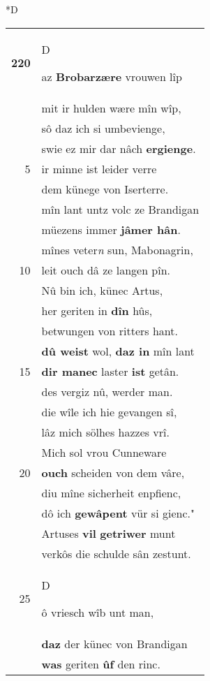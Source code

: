 \documentclass[8pt,a4paper,notitlepage]{article}
\begin{document}
\begin{table}[ht]
\begin{minipage}[t]{0.5\linewidth}
\small
\begin{center}*D
\end{center}
\begin{tabular}{rl}
\textbf{220} & \begin{large}D\end{large}az \textbf{Brobarzære} vrouwen lîp\\ 
 & mit ir hulden wære mîn wîp,\\ 
 & sô daz ich si umbevienge,\\ 
 & swie ez mir dar nâch \textbf{ergienge}.\\ 
5 & ir minne ist leider verre\\ 
 & dem künege von Iserterre.\\ 
 & mîn lant untz volc ze Brandigan\\ 
 & müezens immer \textbf{jâmer hân}.\\ 
 & mînes veter\textit{n} sun, Mabonagrin,\\ 
10 & leit ouch dâ ze langen pîn.\\ 
 & Nû bin ich, künec Artus,\\ 
 & her geriten in \textbf{dîn} hûs,\\ 
 & betwungen von ritters hant.\\ 
 & \textbf{dû weist} wol, \textbf{daz in} mîn lant\\ 
15 & \textbf{dir manec} laster \textbf{ist} getân.\\ 
 & des vergiz nû, werder man.\\ 
 & die wîle ich hie gevangen sî,\\ 
 & lâz mich sölhes hazzes vrî.\\ 
 & Mich sol vrou Cunneware\\ 
20 & \textbf{ouch} scheiden von dem vâre,\\ 
 & diu mîne sicherheit enpfienc,\\ 
 & dô ich \textbf{gewâpent} vür si gienc."\\ 
 & Artuses \textbf{vil} \textbf{getriwer} munt\\ 
 & verkôs die schulde sân zestunt.\\ 
25 & \begin{large}D\end{large}ô vriesch wîb unt man,\\ 
 & \textbf{daz} der künec von Brandigan\\ 
 & \textbf{was} geriten \textbf{ûf} den rinc.\\ 

\end{tabular}
\end{minipage}
\end{table}
\end{document}
